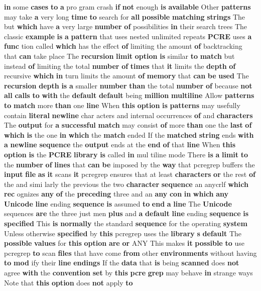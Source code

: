 {\bf in} some {\bf cases} {\bf to} {\bf a} pro gram crash {\bf if} {\bf not} enough {\bf is} {\bf available} Other {\bf patterns} may take {\bf a} very long {\bf time} {\bf to} search for {\bf all} {\bf possible} {\bf matching} {\bf strings} The but {\bf which} have {\bf a} very large {\bf number} {\bf of} possibilities {\bf in} their search trees The classic {\bf example} {\bf is} {\bf a} {\bf pattern} that uses nested unlimited repeats {\bf P\+C\+RE} uses {\bf a} {\bf func} tion called {\bf which} has the effect {\bf of} limiting the amount {\bf of} backtracking that {\bf can} take place The {\bf recursion} {\bf limit} {\bf option} {\bf is} similar {\bf to} {\bf match} but instead {\bf of} limiting the total {\bf number} {\bf of} {\bf times} that {\bf it} limits the {\bf depth} {\bf of} recursive {\bf which} {\bf in} turn limits the amount {\bf of} {\bf memory} that {\bf can} {\bf be} {\bf used} The {\bf recursion} {\bf depth} {\bf is} {\bf a} smaller {\bf number} {\bf than} the total {\bf number} {\bf of} because {\bf not} {\bf all} {\bf calls} {\bf to} {\bf with} the {\bf default} {\bf default} being {\bf million} {\bf multiline} Allow {\bf patterns} {\bf to} {\bf match} more {\bf than} one {\bf line} When {\bf this} {\bf option} {\bf is} {\bf patterns} may usefully contain {\bf literal} {\bf newline} char acters and internal occurrences {\bf of} and {\bf characters} The {\bf output} for {\bf a} {\bf successful} {\bf match} may consist {\bf of} more {\bf than} one the {\bf last} {\bf of} {\bf which} {\bf is} the one {\bf in} {\bf which} the {\bf match} ended If the {\bf matched} {\bf string} ends {\bf with} {\bf a} {\bf newline} {\bf sequence} the {\bf output} ends at the {\bf end} {\bf of} that {\bf line} When {\bf this} {\bf option} {\bf is} the {\bf P\+C\+RE} {\bf library} {\bf is} called {\bf in} mul tiline mode There {\bf is} {\bf a} {\bf limit} {\bf to} the {\bf number} {\bf of} {\bf lines} that {\bf can} {\bf be} imposed by the {\bf way} that pcregrep buffers the {\bf input} {\bf file} {\bf as} {\bf it} scans {\bf it} pcregrep ensures that at least {\bf characters} {\bf or} the rest {\bf of} the and simi larly the previous the two {\bf character} {\bf sequence} an anycrlf {\bf which} {\bf rec} ognizes {\bf any} {\bf of} the {\bf preceding} three and an {\bf any} {\bf con} {\bf in} {\bf which} {\bf any} {\bf Unicode} {\bf line} ending {\bf sequence} {\bf is} assumed {\bf to} {\bf end} {\bf a} {\bf line} The {\bf Unicode} sequences {\bf are} the three just men {\bf plus} and {\bf a} {\bf default} {\bf line} ending {\bf sequence} {\bf is} {\bf specified} This {\bf is} {\bf normally} the standard {\bf sequence} for the operating {\bf system} Unless otherwise {\bf specified} by {\bf this} pcregrep uses the {\bf library} {\bf s} {\bf default} The {\bf possible} {\bf values} for {\bf this} {\bf option} {\bf are} {\bf or} A\+NY This makes {\bf it} {\bf possible} {\bf to} use pcregrep {\bf to} scan {\bf files} that have come {\bf from} other {\bf environments} without having {\bf to} {\bf mod} ify their {\bf line} {\bf endings} If the {\bf data} that {\bf is} being {\bf scanned} does {\bf not} agree {\bf with} the {\bf convention} {\bf set} by {\bf this} {\bf pcre} {\bf grep} may behave {\bf in} strange ways Note that {\bf this} {\bf option} does {\bf not} apply {\bf to} 